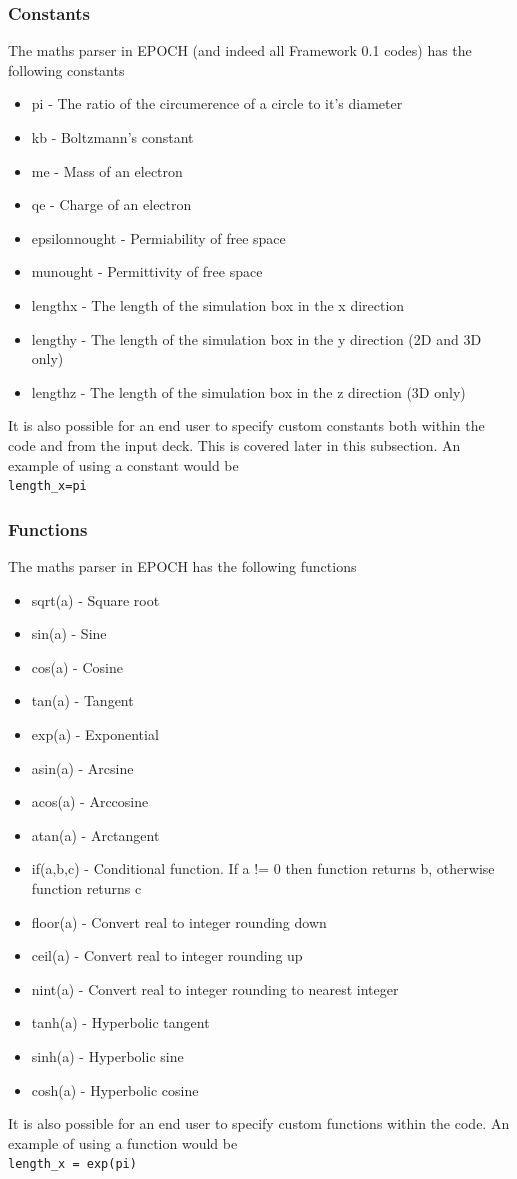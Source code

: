 \documentclass[12pt]{article}
\begin{document}
\subsubsection{Constants}
The maths parser in EPOCH (and indeed all Framework 0.1 codes) has the following constants
\begin{itemize}
\item pi - The ratio of the circumerence of a circle to it's diameter
\item kb - Boltzmann's constant
\item me - Mass of an electron
\item qe - Charge of an electron
\item epsilonnought - Permiability of free space
\item munought - Permittivity of free space
\item lengthx - The length of the simulation box in the x direction
\item lengthy - The length of the simulation box in the y direction (2D and 3D only)
\item lengthz - The length of the simulation box in the z direction (3D only)
\end{itemize}
It is also possible for an end user to specify custom constants both within the code and from the input deck. This is covered later in this subsection. An example of using a constant would be\\
\texttt{length\_x=pi}\\
\subsubsection{Functions}
The maths parser in EPOCH has the following functions
\begin{itemize}
\item sqrt(a) - Square root
\item sin(a) - Sine
\item cos(a) - Cosine
\item tan(a) - Tangent
\item exp(a) - Exponential
\item asin(a) - Arcsine
\item acos(a) - Arccosine
\item atan(a) - Arctangent
\item if(a,b,c) - Conditional function. If a != 0 then function returns b, otherwise function returns c
\item floor(a) - Convert real to integer rounding down
\item ceil(a) - Convert real to integer rounding up
\item nint(a) - Convert real to integer rounding to nearest integer
\item tanh(a) - Hyperbolic tangent
\item sinh(a) - Hyperbolic sine
\item cosh(a) - Hyperbolic cosine
\end{itemize}
It is also possible for an end user to specify custom functions within the code. An example of using a function would be\\
\texttt{length\_x = exp(pi)}\\
\end{document}
